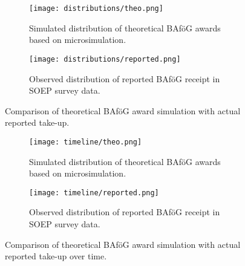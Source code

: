 \begin{figure}[htbp]
  \centering
  \begin{subfigure}[t]{0.42\linewidth}
    \texttt{[image: distributions/theo.png]}
    \caption{Simulated distribution of theoretical BAföG awards based on microsimulation.}
    \label{fig:simulated_distribution}
  \end{subfigure}
  \hfill
  \begin{subfigure}[t]{0.42\linewidth}
    \texttt{[image: distributions/reported.png]}
    \caption{Observed distribution of reported BAföG receipt in SOEP survey data.}
    \label{fig:reported_distribution}
  \end{subfigure}
  \caption{Comparison of theoretical BAföG award simulation with actual reported take-up.}
  \label{fig:bafoeg_distribution_comparison}
\end{figure}

\begin{figure}[htbp]
  \centering
  \begin{subfigure}[t]{0.42\linewidth}
    \texttt{[image: timeline/theo.png]}
    \caption{Simulated distribution of theoretical BAföG awards based on microsimulation.}
    \label{fig:simulated_timeline}
  \end{subfigure}
  \hfill
  \begin{subfigure}[t]{0.42\linewidth}
    \texttt{[image: timeline/reported.png]}
    \caption{Observed distribution of reported BAföG receipt in SOEP survey data.}
    \label{fig:reported_timeline}
  \end{subfigure}
  \caption{Comparison of theoretical BAföG award simulation with actual reported take-up over time.}
  \label{fig:bafoeg_timeline_comparison}
\end{figure}

